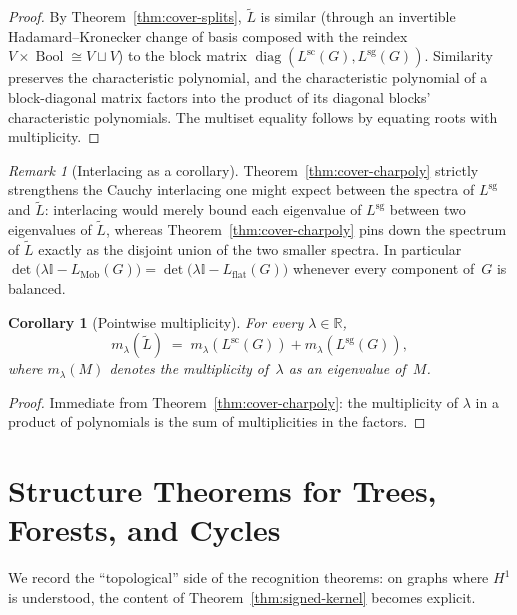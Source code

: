 \documentclass[11pt,a4paper]{amsart}
\theoremstyle{plain}
\newtheorem{corollary}[theorem]{Corollary}
\theoremstyle{definition}
\theoremstyle{remark}
\newtheorem{remark}[theorem]{Remark}
\DeclareMathOperator{\diag}{diag}
\newcommand{\RR}{\mathbb{R}}
\newcommand{\II}{\mathbb{I}}
\newcommand{\tL}{\widetilde{L}}
\newcommand{\Lscalar}{L^{\operatorname{sc}}}
\newcommand{\Lsigned}{L^{\operatorname{sg}}}
\begin{document}
\begin{proof}
By Theorem~\ref{thm:cover-splits}, $\tL$ is similar (through an
invertible Hadamard--Kronecker change of basis composed with the
reindex $V\times\operatorname{Bool}\cong V\sqcup V$) to the block
matrix $\diag(\Lscalar(G),\Lsigned(G))$. Similarity preserves the
characteristic polynomial, and the characteristic polynomial of a
block-diagonal matrix factors into the product of its diagonal
blocks' characteristic polynomials. The multiset equality follows by
equating roots with multiplicity.
\end{proof}

\begin{remark}[Interlacing as a corollary]
Theorem~\ref{thm:cover-charpoly} strictly strengthens the Cauchy
interlacing one might expect between the spectra of $\Lsigned$ and
$\tL$: interlacing would merely bound each eigenvalue of $\Lsigned$
between two eigenvalues of $\tL$, whereas
Theorem~\ref{thm:cover-charpoly} pins down the spectrum of $\tL$
exactly as the disjoint union of the two smaller spectra. In
particular $\det\bigl(\lambda\II - L_{\mathrm{Mob}}(G)\bigr) =
\det\bigl(\lambda\II - L_{\mathrm{flat}}(G)\bigr)$ whenever every
component of~$G$ is balanced.
\end{remark}

\begin{corollary}[Pointwise multiplicity]\label{cor:mult-pointwise}
For every $\lambda\in\RR$,
\[
  m_\lambda(\tL) \;=\; m_\lambda(\Lscalar(G)) + m_\lambda(\Lsigned(G)),
\]
where $m_\lambda(M)$ denotes the multiplicity of~$\lambda$ as an
eigenvalue of~$M$.
\end{corollary}

\begin{proof}
Immediate from Theorem~\ref{thm:cover-charpoly}: the multiplicity of
$\lambda$ in a product of polynomials is the sum of multiplicities
in the factors.
\end{proof}

\section{Structure Theorems for Trees, Forests, and Cycles}
\label{sec:structure}

We record the ``topological'' side of the recognition theorems: on
graphs where $H^1$ is understood, the content of
Theorem~\ref{thm:signed-kernel} becomes explicit.
\end{document}
